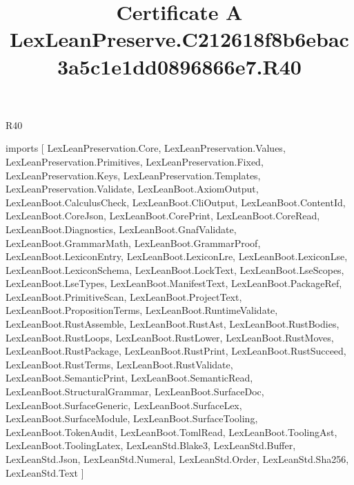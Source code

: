 \begin{lexlean}{R40}
\title{Certificate A LexLeanPreserve.C212618f8b6ebac3a5c1e1dd0896866e7.R40}
\begin{coremodule}
imports [
  LexLeanPreservation.Core,
  LexLeanPreservation.Values,
  LexLeanPreservation.Primitives,
  LexLeanPreservation.Fixed,
  LexLeanPreservation.Keys,
  LexLeanPreservation.Templates,
  LexLeanPreservation.Validate,
  LexLeanBoot.AxiomOutput,
  LexLeanBoot.CalculusCheck,
  LexLeanBoot.CliOutput,
  LexLeanBoot.ContentId,
  LexLeanBoot.CoreJson,
  LexLeanBoot.CorePrint,
  LexLeanBoot.CoreRead,
  LexLeanBoot.Diagnostics,
  LexLeanBoot.GnafValidate,
  LexLeanBoot.GrammarMath,
  LexLeanBoot.GrammarProof,
  LexLeanBoot.LexiconEntry,
  LexLeanBoot.LexiconLre,
  LexLeanBoot.LexiconLse,
  LexLeanBoot.LexiconSchema,
  LexLeanBoot.LockText,
  LexLeanBoot.LseScopes,
  LexLeanBoot.LseTypes,
  LexLeanBoot.ManifestText,
  LexLeanBoot.PackageRef,
  LexLeanBoot.PrimitiveScan,
  LexLeanBoot.ProjectText,
  LexLeanBoot.PropositionTerms,
  LexLeanBoot.RuntimeValidate,
  LexLeanBoot.RustAssemble,
  LexLeanBoot.RustAst,
  LexLeanBoot.RustBodies,
  LexLeanBoot.RustLoops,
  LexLeanBoot.RustLower,
  LexLeanBoot.RustMoves,
  LexLeanBoot.RustPackage,
  LexLeanBoot.RustPrint,
  LexLeanBoot.RustSucceed,
  LexLeanBoot.RustTerms,
  LexLeanBoot.RustValidate,
  LexLeanBoot.SemanticPrint,
  LexLeanBoot.SemanticRead,
  LexLeanBoot.StructuralGrammar,
  LexLeanBoot.SurfaceDoc,
  LexLeanBoot.SurfaceGeneric,
  LexLeanBoot.SurfaceLex,
  LexLeanBoot.SurfaceModule,
  LexLeanBoot.SurfaceTooling,
  LexLeanBoot.TokenAudit,
  LexLeanBoot.TomlRead,
  LexLeanBoot.ToolingAst,
  LexLeanBoot.ToolingLatex,
  LexLeanStd.Blake3,
  LexLeanStd.Buffer,
  LexLeanStd.Json,
  LexLeanStd.Numeral,
  LexLeanStd.Order,
  LexLeanStd.Sha256,
  LexLeanStd.Text
]


\end{coremodule}
\end{lexlean}

